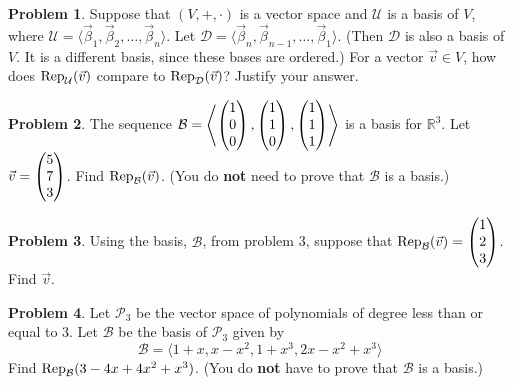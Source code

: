 \documentclass[11pt]{article}
\newcommand{\R}{{\mathbb R}}
\theoremstyle{definition}
\newtheorem{problem}{Problem}
\newenvironment{answer}{\par\bigskip\bgroup\color{darkblue}}{\egroup}
\begin{document}
\begin{answer}
\end{answer}




\begin{problem}
Suppose that $(V,+,\cdot)$ is a vector space and $\mathcal U$ is a basis of $V$, where
$\mathcal{U} = \langle \vec\beta_1, \vec\beta_2, \dots, \vec\beta_n \rangle$.
Let $\mathcal{D} = \langle \vec\beta_n, \vec\beta_{n-1}, \dots, \vec\beta_1 \rangle$.
(Then $\mathcal{D}$ is also a basis of $V$.  It is a different basis, since these bases
are ordered.)  
For a vector $\vec v\in V$, how
does ${\rm Rep}_{\mathcal{U}}(\vec v)$ compare to ${\rm Rep}_{\mathcal{D}}(\vec v)$?
Justify your answer.
\end{problem}

\begin{answer}
\end{answer}




\begin{problem}
The sequence $\mathcal{B}=\left\langle\begin{pmatrix}1 \\ 0 \\ 0\end{pmatrix},\begin{pmatrix}1 \\ 1 \\ 0\end{pmatrix},\begin{pmatrix}1 \\ 1 \\ 1\end{pmatrix}\right\rangle$ is
a basis for $\R^3$.\vadjust{\bigskip} 
 Let $\vec v=\begin{pmatrix}5 \\ 7 \\ 3\end{pmatrix}$.  Find
${\rm Rep}_{\mathcal{B}}(\vec v)$. (You do \textbf{not} need to prove that $\mathcal B$ is a basis.)
\end{problem}

\begin{answer}
\end{answer}




\begin{problem}
 Using the basis, $\mathcal B$, from  problem 3, suppose that
${\rm Rep}_{\mathcal{B}}(\vec v)=\begin{pmatrix}1 \\ 2 \\ 3\end{pmatrix}$.  Find $\vec v$.
\end{problem}

\begin{answer}
\end{answer}



\begin{problem}
Let $\mathscr{P}_3$ be the vector space of polynomials of degree less than or equal to 3.
Let $\mathcal{B}$ be the basis of $\mathscr{P}_3$ given by
$$\mathcal{B}= \langle 1+x, x-x^2, 1+x^3, 2x-x^2+x^3 \rangle$$
Find ${\rm Rep}_{\mathcal{B}}(3-4x+4x^2+x^3)$.
(You do \textbf{not} have to prove that $\mathcal{B}$ is a basis.)
\end{problem}

\begin{answer}
\end{answer}
\end{document}
